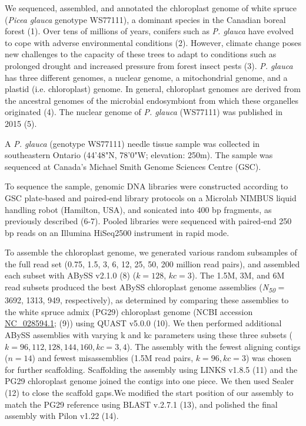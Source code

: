 \documentclass[titlepage,11pt, oneside]{article}   	%
\begin{document}
We sequenced, assembled, and annotated the chloroplast genome of white spruce (\textit{Picea glauca} genotype WS77111), a dominant species in the Canadian boreal forest (1). Over tens of millions of years, conifers such as \textit{P. glauca} have evolved to cope with adverse environmental conditions (2). However, climate change poses new challenges to the capacity of these trees to adapt to conditions such as prolonged drought and increased pressure from forest insect pests (3). \textit{P. glauca} has three different genomes, a nuclear genome, a mitochondrial genome, and a plastid (i.e. chloroplast) genome. In general, chloroplast genomes are derived from the ancestral genomes of the microbial endosymbiont from which these organelles originated (4). The nuclear genome of \textit{P. glauca} (WS77111) was published in 2015 (5).
\newline
\par
A \textit{P. glauca} (genotype WS77111) needle tissue sample was collected in southeastern Ontario (44'48"N, 78'0"W; elevation: 250m). The sample was sequenced at Canada’s Michael Smith Genome Sciences Centre (GSC).
\newline
\par
To sequence the sample, genomic DNA libraries were constructed according to GSC plate-based and paired-end library protocols on a Microlab NIMBUS liquid handling robot (Hamilton, USA), and sonicated into 400 bp fragments, as previously described (6-7). Pooled libraries were sequenced with paired-end 250 bp reads on an Illumina HiSeq2500 instrument in rapid mode.
\newline
\par
To assemble the chloroplast genome, we generated various random subsamples of the full read set (0.75, 1.5, 3, 6, 12, 25, 50, 200 million read pairs), and assembled each subset with ABySS v2.1.0 (8) ($k=128$, $kc=3$). The 1.5M, 3M, and 6M read subsets produced the best ABySS chloroplast genome assemblies (\textit{N\textsubscript{50}} = 3692, 1313, 949, respectively), as determined by comparing these assemblies to the white spruce admix (PG29) chloroplast genome (NCBI accession \href{https://www.ncbi.nlm.nih.gov/nuccore/NC_028594.1}{NC\_028594.1}; (9)) using QUAST v5.0.0 (10). We then performed additional ABySS assemblies with varying k and kc parameters using these three subsets ($k=96, 112, 128, 144, 160, kc=3, 4$). The assembly with the fewest aligning contigs ($n=14$) and fewest misassemblies (1.5M read pairs, $k=96, kc=3$) was chosen for further scaffolding. Scaffolding the assembly using LINKS v1.8.5 (11) and the PG29 chloroplast genome joined the contigs into one piece. We then used Sealer (12) to close the scaffold gaps.We modified the start position of our assembly to match the PG29 reference using BLAST v.2.7.1 (13), and polished the final assembly with Pilon v1.22 (14).
\end{document}
